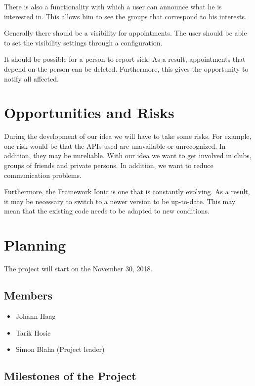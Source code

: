 \documentclass[12pt]{scrartcl}
\begin{document}
        There is also a functionality with which a user can announce what he is interested in.
        This allows him to see the groups that correspond to his interests.
        
        Generally there should be a visibility for appointments.
        The user should be able to set the  visibility settings through a configuration.
        
        It should be possible for a person to report sick. As a result, appointments that depend on the person can be deleted. 
        Furthermore, this gives the opportunity to notify all affected.
    \pagebreak

    \section{Opportunities and Risks}
    
        During the development of our idea we will have to take some risks. For example, one risk would be that the APIs used are unavailable or unrecognized. In addition, they may be unreliable.
        With our idea we want to get involved in clubs, groups of friends and private persons.
        In addition, we want to reduce communication problems.
       

        Furthermore, the Framework Ionic is one that is constantly evolving. As a result, it may be necessary to switch to a newer version to be up-to-date.
        This may mean that the existing code needs to be adapted to new conditions.
    \pagebreak

    \section{Planning}

    \vspace*{15pt}

    The project will start on the November 30, 2018.

    \subsection{Members}
    \begin{itemize}
        \item Johann Haag
        \item Tarik Hosic
        \item Simon Blaha (Project leader)
    \end{itemize}

    \subsection{Milestones of the Project}
    
\end{document}
